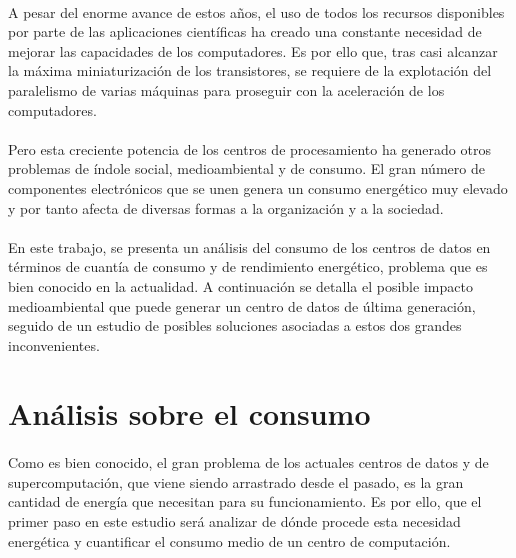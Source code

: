 \documentclass[12pt]{article}
\begin{document}
    \paragraph{}
    A pesar del enorme avance de estos años, el uso de todos los recursos disponibles por parte de las aplicaciones científicas ha creado una constante necesidad de mejorar las capacidades de los computadores. Es por ello que, tras casi alcanzar la máxima miniaturización de los transistores, se requiere de la explotación del paralelismo de varias máquinas para proseguir con la aceleración de los computadores.
    
    \paragraph{}
    Pero esta creciente potencia de los centros de procesamiento ha generado otros problemas de índole social, medioambiental y de consumo. El gran número de componentes electrónicos que se unen genera un consumo energético muy elevado y por tanto afecta de diversas formas a la organización y a la sociedad.
    
    \paragraph{}
    En este trabajo, se presenta un análisis del consumo de los centros de datos en términos de cuantía de consumo y de rendimiento energético, problema que es bien conocido en la actualidad. A continuación se detalla el posible impacto medioambiental que puede generar un centro de datos de última generación, seguido de un estudio de posibles soluciones asociadas a estos dos grandes inconvenientes.


  \section{Análisis sobre el consumo}
  \label{sec:analisis}
  	\paragraph{}
	Como es bien conocido, el gran problema de los actuales centros de datos y de supercomputación, que viene siendo arrastrado desde el pasado, es la gran cantidad de energía que necesitan para su funcionamiento. Es por ello, que el primer paso en este estudio será analizar de dónde procede esta necesidad energética y cuantificar el consumo medio de un centro de computación.
\end{document}

